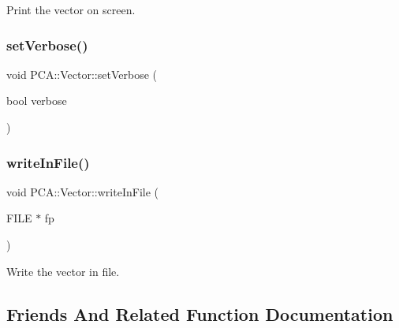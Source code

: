 Print the vector on screen. 

\hypertarget{class_p_c_a_1_1_vector_a585f8511431df02801aa9cff0e2f1ae4}{}\label{class_p_c_a_1_1_vector_a585f8511431df02801aa9cff0e2f1ae4} 
\subsubsection{\texorpdfstring{set\+Verbose()}{setVerbose()}}
{\footnotesize\ttfamily void P\+C\+A\+::\+Vector\+::set\+Verbose (\begin{DoxyParamCaption}\item[{bool}]{verbose }\end{DoxyParamCaption})\hspace{0.3cm}{\ttfamily [static]}}

\hypertarget{class_p_c_a_1_1_vector_a661570b8bb883ca11f033ea4dcdebb79}{}\label{class_p_c_a_1_1_vector_a661570b8bb883ca11f033ea4dcdebb79} 
\subsubsection{\texorpdfstring{write\+In\+File()}{writeInFile()}}
{\footnotesize\ttfamily void P\+C\+A\+::\+Vector\+::write\+In\+File (\begin{DoxyParamCaption}\item[{F\+I\+LE $\ast$}]{fp }\end{DoxyParamCaption})\hspace{0.3cm}{\ttfamily [inline]}}



Write the vector in file. 



\subsection{Friends And Related Function Documentation}
\hypertarget{class_p_c_a_1_1_vector_a89de706cc4a715c026fd01dbee37653c}{}\label{class_p_c_a_1_1_vector_a89de706cc4a715c026fd01dbee37653c} 
